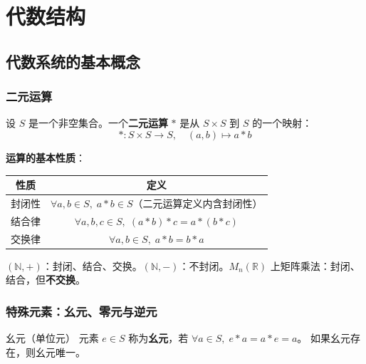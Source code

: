 \chapter{代数结构}

\section{代数系统的基本概念}

\subsection{二元运算}

\begin{mydefinition}{}
设 $S$ 是一个非空集合。一个\textbf{二元运算} $*$ 是从 $S \times S$ 到 $S$ 的一个映射：
\[
* : S \times S \to S, \quad (a,b) \mapsto a * b
\]
\end{mydefinition}

\textbf{运算的基本性质}：

\begin{center}
\begin{tabular}{c|c}
\hline
\textbf{性质} & \textbf{定义} \\
\hline
封闭性 & $\forall a,b\in S,\; a*b \in S$（二元运算定义内含封闭性）\\
结合律 & $\forall a,b,c\in S,\; (a*b)*c = a*(b*c)$ \\
交换律 & $\forall a,b\in S,\; a*b = b*a$ \\
\hline
\end{tabular}
\end{center}

\begin{example}
$(\mathbb{N}, +)$：封闭、结合、交换。$(\mathbb{N}, -)$：不封闭。$M_n(\mathbb{R})$ 上矩阵乘法：封闭、结合，但\textbf{不交换}。
\end{example}

\subsection{特殊元素：幺元、零元与逆元}

\begin{mydefinition}{幺元（单位元）}
元素 $e \in S$ 称为\textbf{幺元}，若 $\forall a \in S,\; e*a = a*e = a$。
如果幺元存在，则幺元唯一。
\end{mydefinition}

